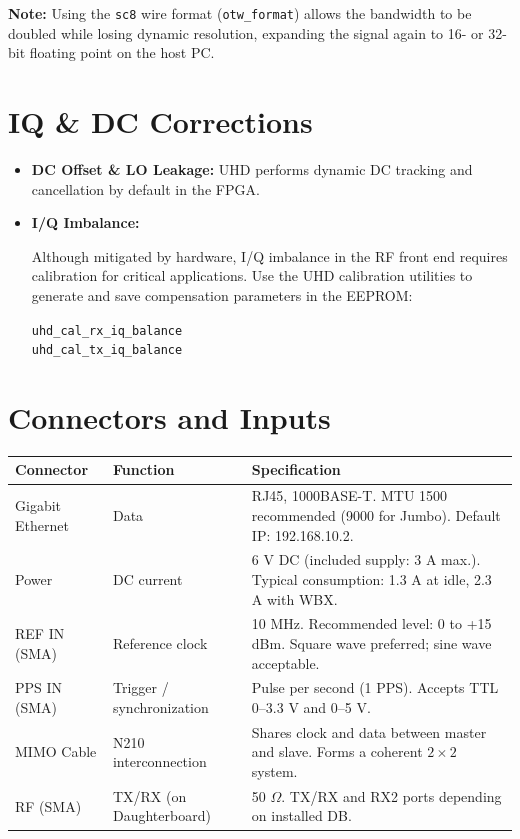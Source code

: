 \documentclass[11pt]{article}
\begin{document}
\textbf{Note:} Using the \texttt{sc8} wire format (\texttt{otw\_format}) allows the bandwidth to be doubled while losing dynamic resolution, expanding the signal again to 16- or 32-bit floating point on the host PC.

\section{IQ \& DC Corrections}

\begin{itemize}
    \item \textbf{DC Offset \& LO Leakage:} UHD performs dynamic DC tracking and cancellation by default in the FPGA.
    \item \textbf{I/Q Imbalance:}
    \begin{pendingbox}
    Although mitigated by hardware, I/Q imbalance in the RF front end requires calibration for critical applications. Use the UHD calibration utilities to generate and save compensation parameters in the EEPROM:

    \noindent\texttt{uhd\_cal\_rx\_iq\_balance}\\
    \texttt{uhd\_cal\_tx\_iq\_balance}
    \end{pendingbox}
\end{itemize}

\section{Connectors and Inputs}

\begin{table}[h]
    \centering
    \small
    \begin{tabular}{p{}p{}p{}}
        \toprule
        \textbf{Connector} & \textbf{Function} & \textbf{Specification} \\
        \midrule
        Gigabit Ethernet & Data & RJ45, 1000BASE-T. MTU 1500 recommended (9000 for Jumbo). Default IP: 192.168.10.2. \\
        Power & DC current & 6 V DC (included supply: 3 A max.). Typical consumption: 1.3 A at idle, 2.3 A with WBX. \\
        REF IN (SMA) & Reference clock & 10 MHz. Recommended level: 0 to +15 dBm. Square wave preferred; sine wave acceptable. \\
        PPS IN (SMA) & Trigger / synchronization & Pulse per second (1 PPS). Accepts TTL 0--3.3 V and 0--5 V. \\
        MIMO Cable & N210 interconnection & Shares clock and data between master and slave. Forms a coherent $2\times2$ system. \\
        RF (SMA) & TX/RX (on Daughterboard) & 50 $\Omega$. TX/RX and RX2 ports depending on installed DB. \\
        \bottomrule
    \end{tabular}
\end{table}
\end{document}

